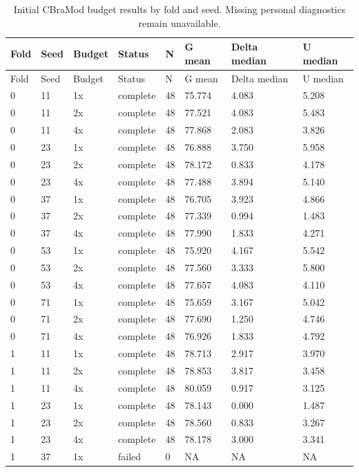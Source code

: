 \begin{longtable}{llllllll}
\caption{Initial CBraMod budget results by fold and seed. Missing personal diagnostics remain unavailable.}\label{tab:budget_cb_runs}\\
\toprule
Fold & Seed & Budget & Status & N & G mean & Delta median & U median \\
\midrule
\endfirsthead
\toprule
Fold & Seed & Budget & Status & N & G mean & Delta median & U median \\
\midrule
\endhead
0 & 11 & 1x & complete & 48 & 75.774 & 4.083 & 5.208 \\
0 & 11 & 2x & complete & 48 & 77.521 & 4.083 & 5.483 \\
0 & 11 & 4x & complete & 48 & 77.868 & 2.083 & 3.826 \\
0 & 23 & 1x & complete & 48 & 76.888 & 3.750 & 5.958 \\
0 & 23 & 2x & complete & 48 & 78.172 & 0.833 & 4.178 \\
0 & 23 & 4x & complete & 48 & 77.488 & 3.894 & 5.140 \\
0 & 37 & 1x & complete & 48 & 76.705 & 3.923 & 4.866 \\
0 & 37 & 2x & complete & 48 & 77.339 & 0.994 & 1.483 \\
0 & 37 & 4x & complete & 48 & 77.990 & 1.833 & 4.271 \\
0 & 53 & 1x & complete & 48 & 75.920 & 4.167 & 5.542 \\
0 & 53 & 2x & complete & 48 & 77.560 & 3.333 & 5.800 \\
0 & 53 & 4x & complete & 48 & 77.657 & 4.083 & 4.110 \\
0 & 71 & 1x & complete & 48 & 75.659 & 3.167 & 5.042 \\
0 & 71 & 2x & complete & 48 & 77.690 & 1.250 & 4.746 \\
0 & 71 & 4x & complete & 48 & 76.926 & 1.833 & 4.792 \\
1 & 11 & 1x & complete & 48 & 78.713 & 2.917 & 3.970 \\
1 & 11 & 2x & complete & 48 & 78.853 & 3.817 & 3.458 \\
1 & 11 & 4x & complete & 48 & 80.059 & 0.917 & 3.125 \\
1 & 23 & 1x & complete & 48 & 78.143 & 0.000 & 1.487 \\
1 & 23 & 2x & complete & 48 & 78.560 & 0.833 & 3.267 \\
1 & 23 & 4x & complete & 48 & 78.178 & 3.000 & 3.341 \\
1 & 37 & 1x & failed & 0 & NA & NA & NA \\

\end{longtable}
